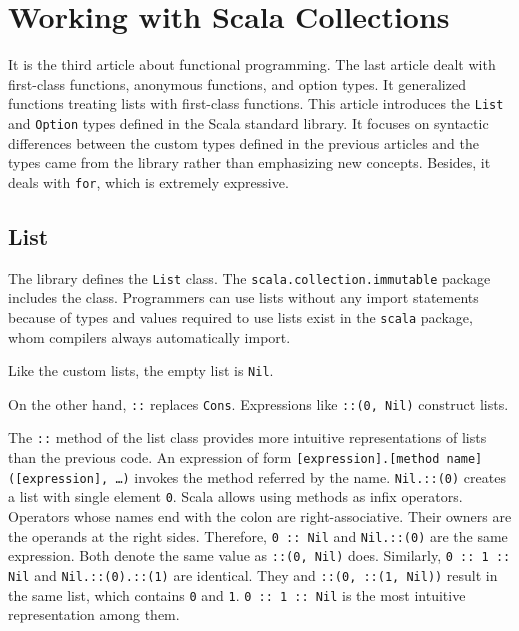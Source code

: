 \setchapterpreamble[u]{\margintoc}
\chapter{Working with Scala Collections}

It is the third article about functional programming. The last article dealt with
first-class functions, anonymous functions, and option types. It generalized
functions treating lists with first-class functions. This article introduces the
\verb!List! and \verb!Option! types defined in the Scala standard library. It
focuses on syntactic differences between the custom types defined in the previous
articles and the types came from the library rather than emphasizing new
concepts. Besides, it deals with \verb!for!, which is extremely expressive.

\section{List}

The library defines the \verb!List! class. The \verb!scala.collection.immutable!
package includes the class. Programmers can use lists without any import
statements because  of types and values required to use lists exist
in the \verb!scala!
package, whom compilers
always automatically import.

Like the custom lists, the empty list is \verb!Nil!.

On the other hand, \verb!::! replaces \verb!Cons!. Expressions like
\verb!::(0, Nil)! construct lists.

The \verb!::! method of the list class provides more intuitive representations of
lists than the previous code. An expression of form \verb![expression].[method name]([expression], …)!
invokes the method referred by the name. \verb!Nil.::(0)!
creates a list with single element \verb!0!. Scala allows using methods as infix
operators. Operators whose names end with the colon are right-associative. Their
owners are the operands at the right sides. Therefore, \verb!0 :: Nil! and
\verb!Nil.::(0)! are the same expression. Both denote the same value as
\verb!::(0, Nil)! does. Similarly, \verb!0 :: 1 :: Nil! and
\verb!Nil.::(0).::(1)! are identical. They and \verb!::(0, ::(1, Nil))! result in
the same list, which contains \verb!0! and \verb!1!. \verb!0 :: 1 :: Nil! is the
most intuitive representation among them.

